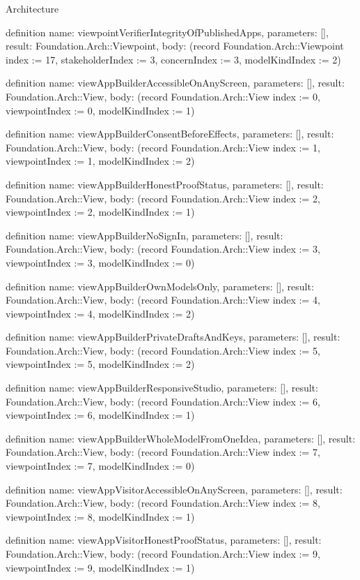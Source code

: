 \begin{lexlean}{Architecture}
\begin{semanticmodule}
definition{
  name: viewpointVerifierIntegrityOfPublishedApps,
  parameters: [],
  result: Foundation.Arch::Viewpoint,
  body: (record Foundation.Arch::Viewpoint {index := 17, stakeholderIndex := 3, concernIndex := 3, modelKindIndex := 2})
}

definition{
  name: viewAppBuilderAccessibleOnAnyScreen,
  parameters: [],
  result: Foundation.Arch::View,
  body: (record Foundation.Arch::View {index := 0, viewpointIndex := 0, modelKindIndex := 1})
}

definition{
  name: viewAppBuilderConsentBeforeEffects,
  parameters: [],
  result: Foundation.Arch::View,
  body: (record Foundation.Arch::View {index := 1, viewpointIndex := 1, modelKindIndex := 2})
}

definition{
  name: viewAppBuilderHonestProofStatus,
  parameters: [],
  result: Foundation.Arch::View,
  body: (record Foundation.Arch::View {index := 2, viewpointIndex := 2, modelKindIndex := 1})
}

definition{
  name: viewAppBuilderNoSignIn,
  parameters: [],
  result: Foundation.Arch::View,
  body: (record Foundation.Arch::View {index := 3, viewpointIndex := 3, modelKindIndex := 0})
}

definition{
  name: viewAppBuilderOwnModelsOnly,
  parameters: [],
  result: Foundation.Arch::View,
  body: (record Foundation.Arch::View {index := 4, viewpointIndex := 4, modelKindIndex := 2})
}

definition{
  name: viewAppBuilderPrivateDraftsAndKeys,
  parameters: [],
  result: Foundation.Arch::View,
  body: (record Foundation.Arch::View {index := 5, viewpointIndex := 5, modelKindIndex := 2})
}

definition{
  name: viewAppBuilderResponsiveStudio,
  parameters: [],
  result: Foundation.Arch::View,
  body: (record Foundation.Arch::View {index := 6, viewpointIndex := 6, modelKindIndex := 1})
}

definition{
  name: viewAppBuilderWholeModelFromOneIdea,
  parameters: [],
  result: Foundation.Arch::View,
  body: (record Foundation.Arch::View {index := 7, viewpointIndex := 7, modelKindIndex := 0})
}

definition{
  name: viewAppVisitorAccessibleOnAnyScreen,
  parameters: [],
  result: Foundation.Arch::View,
  body: (record Foundation.Arch::View {index := 8, viewpointIndex := 8, modelKindIndex := 1})
}

definition{
  name: viewAppVisitorHonestProofStatus,
  parameters: [],
  result: Foundation.Arch::View,
  body: (record Foundation.Arch::View {index := 9, viewpointIndex := 9, modelKindIndex := 1})
}


\end{semanticmodule}
\end{lexlean}
